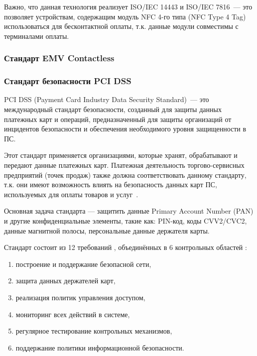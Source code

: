 Важно, что данная технология реализует ISO/IEC 14443 и ISO/IEC 7816~--- это позволяет устройствам, содержащим модуль NFC 4-го типа (NFC Type 4 Tag) использоваться для бесконтактной оплаты, т.к. данные модули совместимы с терминалами оплаты.


\subsubsection{Стандарт EMV Contactless}









\subsubsection{Стандарт безопасности PCI DSS}

PCI DSS (Payment Card Industry Data Security Standard)~--- это международный стандарт безопасности, созданный для защиты данных платежных карт и операций, предназначенный для защиты организаций от инцидентов безопасности и обеспечения необходимого уровня защищенности в ПС.
 
Этот стандарт применяется организациями, которые хранят, обрабатывают и передают данные платежных карт.
Платежная деятельность торгово-сервисных предприятий (точек продаж) также должна соответствовать данному стандарту, т.к. они имеют возможность влиять на безопасность данных карт ПС, используемых для оплаты товаров и услуг~\cite{nspk_security}.

Основная задача стандарта — защитить данные Primary Account Number (PAN) и другие конфиденциальные элементы, такие как: PIN-код, коды CVV2/CVC2, данные магнитной полосы, персональные данные держателя карты.

Стандарт состоит из 12 требований , объединённых в 6 контрольных областей :

\begin{enumerate}
    \item построение и поддержание безопасной сети,
    \item защита данных держателей карт,
    \item реализация политик управления доступом,
    \item мониторинг всех действий в системе,
    \item регулярное тестирование контрольных механизмов,
    \item поддержание политики информационной безопасности.
\end{enumerate}

